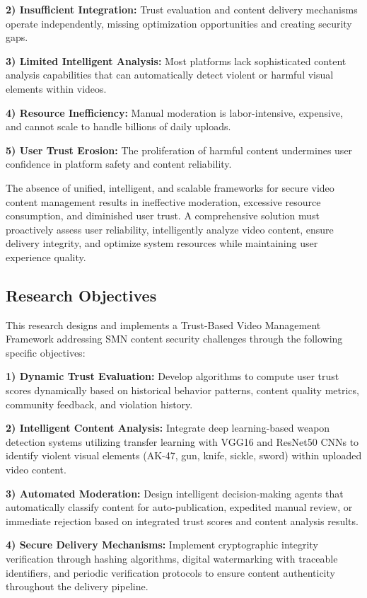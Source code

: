\documentclass[conference]{IEEEtran}
\begin{document}
\textbf{2) Insufficient Integration:} Trust evaluation and content delivery mechanisms operate independently, missing optimization opportunities and creating security gaps.

\textbf{3) Limited Intelligent Analysis:} Most platforms lack sophisticated content analysis capabilities that can automatically detect violent or harmful visual elements within videos.

\textbf{4) Resource Inefficiency:} Manual moderation is labor-intensive, expensive, and cannot scale to handle billions of daily uploads.

\textbf{5) User Trust Erosion:} The proliferation of harmful content undermines user confidence in platform safety and content reliability.

The absence of unified, intelligent, and scalable frameworks for secure video content management results in ineffective moderation, excessive resource consumption, and diminished user trust. A comprehensive solution must proactively assess user reliability, intelligently analyze video content, ensure delivery integrity, and optimize system resources while maintaining user experience quality.

\subsection{Research Objectives}

This research designs and implements a Trust-Based Video Management Framework addressing SMN content security challenges through the following specific objectives:

\textbf{1) Dynamic Trust Evaluation:} Develop algorithms to compute user trust scores dynamically based on historical behavior patterns, content quality metrics, community feedback, and violation history.

\textbf{2) Intelligent Content Analysis:} Integrate deep learning-based weapon detection systems utilizing transfer learning with VGG16 and ResNet50 CNNs to identify violent visual elements (AK-47, gun, knife, sickle, sword) within uploaded video content.

\textbf{3) Automated Moderation:} Design intelligent decision-making agents that automatically classify content for auto-publication, expedited manual review, or immediate rejection based on integrated trust scores and content analysis results.

\textbf{4) Secure Delivery Mechanisms:} Implement cryptographic integrity verification through hashing algorithms, digital watermarking with traceable identifiers, and periodic verification protocols to ensure content authenticity throughout the delivery pipeline.
\end{document}
